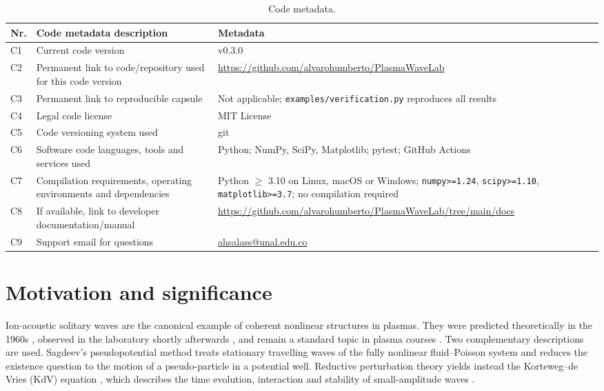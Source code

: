 \documentclass[preprint,12pt]{elsarticle}
\begin{document}
\begin{table}[h!]
\centering\small
\begin{tabular}{|p{0.7cm}|p{5.3cm}|p{6.2cm}|}
\hline
\textbf{Nr.} & \textbf{Code metadata description} & \textbf{Metadata} \\
\hline
C1 & Current code version & v0.3.0 \\
\hline
C2 & Permanent link to code/repository used for this code version &
\url{https://github.com/alvarohumberto/PlasmaWaveLab} \\
\hline
C3 & Permanent link to reproducible capsule & Not applicable;
\texttt{examples/verification.py} reproduces all results \\
\hline
C4 & Legal code license & MIT License \\
\hline
C5 & Code versioning system used & git \\
\hline
C6 & Software code languages, tools and services used & Python; NumPy, SciPy,
Matplotlib; pytest; GitHub Actions \\
\hline
C7 & Compilation requirements, operating environments and dependencies &
Python $\geq$ 3.10 on Linux, macOS or Windows; \texttt{numpy>=1.24},
\texttt{scipy>=1.10}, \texttt{matplotlib>=3.7}; no compilation required \\
\hline
C8 & If available, link to developer documentation/manual &
\url{https://github.com/alvarohumberto/PlasmaWaveLab/tree/main/docs} \\
\hline
C9 & Support email for questions & \href{mailto:ahsalass@unal.edu.co}{ahsalass@unal.edu.co} \\
\hline
\end{tabular}
\caption{Code metadata.}
\label{tab:metadata}
\end{table}

\linenumbers

\section{Motivation and significance}
\label{sec:motivation}

Ion-acoustic solitary waves are the canonical example of coherent nonlinear
structures in plasmas. They were predicted theoretically in the 1960s
\cite{Sagdeev1966,WashimiTaniuti1966}, observed in the laboratory shortly
afterwards \cite{Ikezi1970}, and remain a standard topic in plasma courses
\cite{Chen2016}. Two complementary descriptions are used. Sagdeev's
pseudopotential method \cite{Sagdeev1966} treats stationary travelling waves of
the fully nonlinear fluid--Poisson system and reduces the existence question to
the motion of a pseudo-particle in a potential well. Reductive perturbation
theory \cite{WashimiTaniuti1966} yields instead the Korteweg--de Vries (KdV)
equation \cite{Korteweg1895}, which describes the time evolution, interaction and
stability of small-amplitude waves \cite{ZabuskyKruskal1965,DrazinJohnson1989}.
\end{document}
